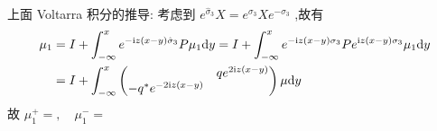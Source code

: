\begin{remark}
上面 Voltarra 积分的推导: 考虑到 $ e^{\hat{\sigma}_{3}} X = e^{\sigma_{3}} X e^{-\sigma_{3}} $ ,故有
\begin{equation*}
  \begin{aligned}
  \mu_{1} &= I + \int_{-\infty}^{x} e^{- \mathrm{i} z(x-y) \hat{\sigma}_{3}} P \mu_{1} \mathrm{d} y = I + \int_{-\infty}^{x} e^{- \mathrm{i} z(x-y) \sigma_{3}} P e^{\mathrm{i} z(x-y) \sigma_{3}} \mu_{1} \mathrm{d} y \\
          &= I + \int_{-\infty}^{x} \begin{pmatrix}
            & qe^{2\mathrm{i} z(x-y)} \\ - q^{*}e^{-2\mathrm{i} z(x-y)}  & 
          \end{pmatrix} \mu \mathrm{d} y
  \end{aligned} 
\end{equation*}
故 $ \mu_{1}^{+} = , \quad \mu_{1}^{-} = $
\end{remark}
